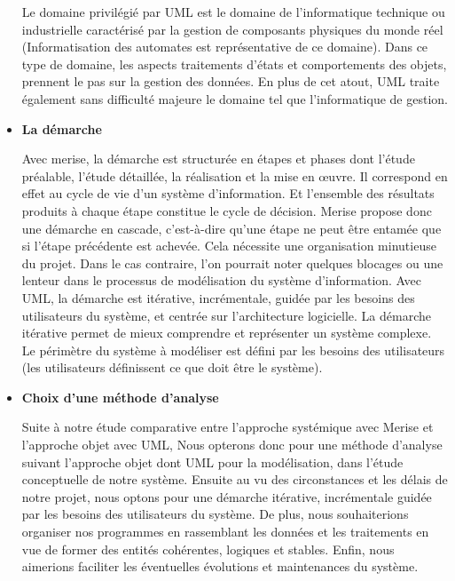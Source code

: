 \begin{itemize}
	      Le domaine privilégié par UML est le domaine de l’informatique technique ou industrielle caractérisé par la gestion de composants physiques du monde réel (Informatisation des automates est représentative de ce domaine). 
		  Dans ce type de domaine, les aspects traitements d’états et comportements des objets, prennent le pas sur la gestion des données. 
		  En plus de cet atout, UML traite également sans difficulté majeure le domaine tel que l’informatique de gestion.

	\item \textbf{La démarche}

	      Avec merise, la démarche est structurée en étapes et phases dont l’étude préalable, l’étude
	      détaillée, la réalisation et la mise en œuvre. Il correspond en effet au cycle de vie d’un système
	      d’information. Et l’ensemble des résultats produits à chaque étape constitue le cycle de décision.
	      Merise propose donc une démarche en cascade, c’est-à-dire qu’une étape ne peut être entamée
	      que si l’étape précédente est achevée. Cela nécessite une organisation minutieuse du projet.
	      Dans le cas contraire, l’on pourrait noter quelques blocages ou une lenteur dans le processus
	      de modélisation du système d’information. Avec UML, la démarche est itérative, incrémentale,
	      guidée par les besoins des utilisateurs du système, et centrée sur l’architecture logicielle. La
	      démarche itérative permet de mieux comprendre et représenter un système complexe. Le
	      périmètre du système à modéliser est défini par les besoins des utilisateurs (les utilisateurs
	      définissent ce que doit être le système).

	\item \textbf{Choix d’une méthode d’analyse}

	      Suite à notre étude comparative entre l’approche systémique avec Merise et l’approche objet avec UML, Nous opterons donc pour une méthode d’analyse suivant l’approche objet dont UML pour la modélisation, dans l’étude conceptuelle de notre système.
	      Ensuite au vu des circonstances et les délais de notre projet, nous optons pour une démarche itérative, incrémentale guidée par
	      les besoins des utilisateurs du système. De plus, nous souhaiterions organiser nos programmes
	      en rassemblant les données et les traitements en vue de former des entités cohérentes, logiques
	      et stables. Enfin, nous aimerions faciliter les éventuelles évolutions et maintenances du système.
\end{itemize}

